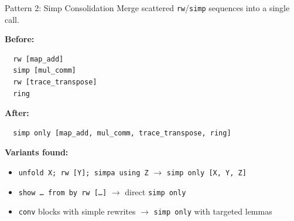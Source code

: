 \documentclass[aspectratio=169,10pt]{beamer}
\begin{document}
\begin{frame}[fragile]{Pattern 2: Simp Consolidation}
    \vspace{-0.3em}
    Merge scattered \texttt{rw}/\texttt{simp} sequences into a single call.

    \vspace{0.3em}
    \textbf{\textcolor{softred}{Before:}}
    \begin{lstlisting}
  rw [map_add]
  simp [mul_comm]
  rw [trace_transpose]
  ring
    \end{lstlisting}

    \textbf{\textcolor{leangreen}{After:}}
    \begin{lstlisting}
  simp only [map_add, mul_comm, trace_transpose, ring]
    \end{lstlisting}

    \vspace{0.4em}
    {\small
    \textbf{Variants found:}
    \begin{itemize}\itemsep0.1em
        \item \texttt{unfold X; rw [Y]; simpa using Z} $\to$ \texttt{simp only [X, Y, Z]}
        \item \texttt{show \ldots\ from by rw [\ldots]} $\to$ direct \texttt{simp only}
        \item \texttt{conv} blocks with simple rewrites $\to$ \texttt{simp only} with targeted lemmas
    \end{itemize}
    }
\end{frame}
\end{document}
